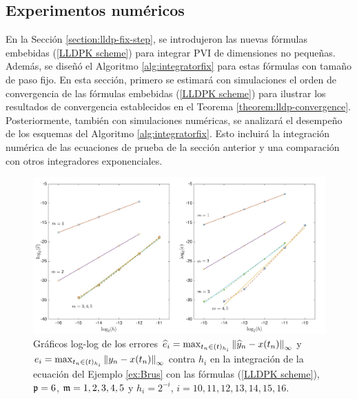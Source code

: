 \subsection{Experimentos numéricos}\label{section:num-exp-lldp-fix-step}
En la Sección \ref{section:lldp-fix-step}, se introdujeron las nuevas fórmulas embebidas (\ref{LLDPK scheme}) para integrar PVI de dimensiones no pequeñas. Además, se diseñó el Algoritmo \ref{alg:integratorfix} para estas fórmulas con tamaño de paso fijo. En esta sección, primero se estimará con simulaciones el orden de convergencia de las fórmulas embebidas (\ref{LLDPK scheme}) para ilustrar los resultados de convergencia establecidos en el Teorema \ref{theorem:lldp-convergence}. Posteriormente, también con simulaciones numéricas, se analizará el desempeño de los esquemas del Algoritmo \ref{alg:integratorfix}. Esto incluirá la integración numérica de las ecuaciones de prueba de la sección anterior y una comparación con otros integradores exponenciales.

\begin{figure}[htb]
	\begin{center}
		\includegraphics[scale=0.45]{Graphics/lldp/m-plots.jpg}
		\caption{Gráficos log-log de los errores $\widehat{e}_i=\max_{t_n\in(t)_{h_i}}\left\lVert \widehat{y}_n-x(t_n) \right\rVert_\infty$ y $e_i=\max_{t_n\in(t)_{h_i}}\left\lVert y_n-x(t_n) \right\rVert_\infty$ contra $h_i$ en la integración de la ecuación del Ejemplo \ref{ex:Brus} con las fórmulas (\ref{LLDPK scheme}), $\mathfrak{p}=6$, $\mathfrak{m}=1,2,3,4,5$ y $h_i=2^{-i}$, $i=10,11,12,13,14,15,16$.}
		\label{fig:num-exp-lldp-fix-step:Fig3}
	\end{center}
\end{figure}

